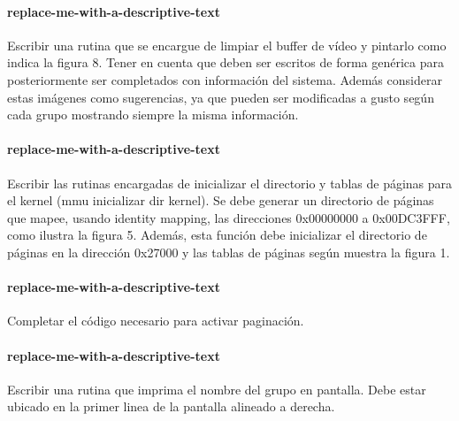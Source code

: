 \paragraph{replace-me-with-a-descriptive-text}\label{subsubsec:ej3-a}
Escribir una rutina que se encargue de limpiar el buffer de vídeo y pintarlo
como indica la figura 8. Tener en cuenta que deben ser escritos de forma
genérica para posteriormente ser completados con información del sistema. Además
considerar estas imágenes como sugerencias, ya que pueden ser modificadas a
gusto según cada grupo mostrando siempre la misma información.
\hruler
{}

\paragraph{replace-me-with-a-descriptive-text}\label{subsubsec:ej3-b}
Escribir las rutinas encargadas de inicializar el directorio y tablas de páginas
para el kernel (mmu inicializar dir kernel). Se debe generar un directorio de
páginas que mapee, usando identity mapping, las direcciones 0x00000000 a
0x00DC3FFF, como ilustra la figura 5. Además, esta función debe inicializar el
directorio de páginas en la dirección 0x27000 y las tablas de páginas según
muestra la figura 1.
\hruler
{}

\paragraph{replace-me-with-a-descriptive-text}\label{subsubsec:ej3-c}
Completar el código necesario para activar paginación.
\hruler
{}

\paragraph{replace-me-with-a-descriptive-text}\label{subsubsec:ej3-d}
Escribir una rutina que imprima el nombre del grupo en pantalla. Debe estar
ubicado en la primer linea de la pantalla alineado a derecha.
\hruler
{}
